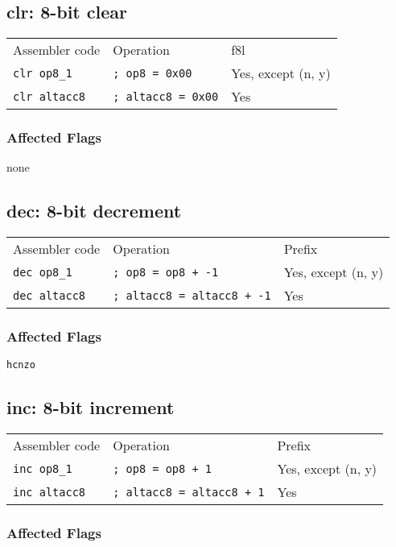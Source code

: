 \documentclass{book}
\begin{document}
\subsection{clr: 8-bit clear}

\begin{tabular}{l l l}
Assembler code       & Operation                 & f8l \\
\texttt{clr op8\_1}  & \texttt{; op8 = 0x00}     & Yes, except (n, y) \\
\texttt{clr altacc8} & \texttt{; altacc8 = 0x00} & Yes
\end{tabular}

\subsubsection*{Affected Flags}

none


\subsection{dec: 8-bit decrement}

\begin{tabular}{l l l}
Assembler code       & Operation                         & Prefix \\
\texttt{dec op8\_1}  & \texttt{; op8 = op8 + -1}         & Yes, except (n, y) \\
\texttt{dec altacc8} & \texttt{; altacc8 = altacc8 + -1} & Yes
\end{tabular}

\subsubsection*{Affected Flags}

\texttt{hcnzo}


\subsection{inc: 8-bit increment}

\begin{tabular}{l l l}
Assembler code       & Operation                        & Prefix \\
\texttt{inc op8\_1}  & \texttt{; op8 = op8 + 1}         & Yes, except (n, y) \\
\texttt{inc altacc8} & \texttt{; altacc8 = altacc8 + 1} & Yes
\end{tabular}

\subsubsection*{Affected Flags}
\end{document}
